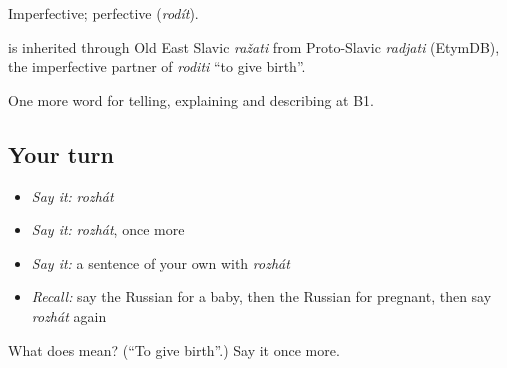 Imperfective; perfective \emph{} (\emph{rodít}).

\begin{cousinweb}
\emph{} is inherited through Old East Slavic \emph{ražati} from Proto-Slavic \emph{radjati} (EtymDB), the imperfective partner of \emph{roditi} \textquotedblleft{}to give birth\textquotedblright{}.
\end{cousinweb}

\begin{grammarlens}[title={What you've built}]
One more word for telling, explaining and describing at B1.
\end{grammarlens}

\subsection*{Your turn}
\begin{itemize}
\raggedright
  \item \emph{Say it:} \emph{rozhát}
  \item \emph{Say it:} \emph{rozhát}, once more
  \item \emph{Say it:} a sentence of your own with \emph{rozhát}
  \item \emph{Recall:} say the Russian for a baby, then the Russian for pregnant, then say \emph{rozhát} again
\end{itemize}

\begin{tcolorbox}[breakable,colback=teal!4,colframe=teal!35!black,title={Before you move on}]
What does  mean? (\textquotedblleft{}To give birth\textquotedblright{}.) Say it once more.
\end{tcolorbox}
